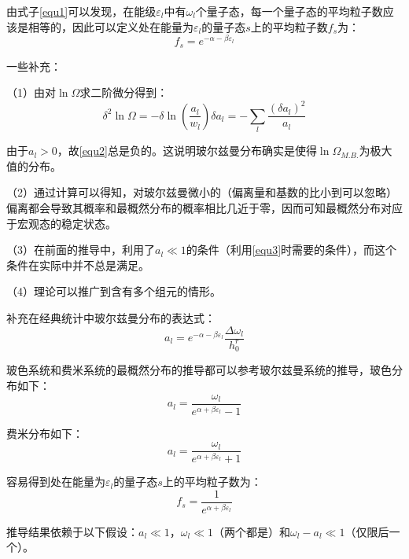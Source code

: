 \documentclass[UTF8]{ctexart}
\begin{document}
	由式子\ref{equ1}可以发现，在能级$ \varepsilon_{l} $中有$ \omega_{l} $个量子态，每一个量子态的平均粒子数应该是相等的，因此可以定义处在能量为$ \varepsilon_{l} $的量子态$ s $上的平均粒子数$ f_{s} $为：
	\begin{equation}
		f_{s}= e^{-\alpha-\beta \varepsilon_{l}}
	\end{equation}
	
	一些补充：
	
	（1）由对$ \ln \Omega $求二阶微分得到：
	\begin{equation}
		\delta^2 \ln \Omega=-\delta \ln \left( \frac{a_{l}}{w_{l}}\right) \delta a_{l}=- \sum_{l} \frac{(\delta a_{l})^2}{a_{l}}\label{equ2}
	\end{equation}
	
\noindent 由于$ a_{l}>0 $，故\ref{equ2}总是负的。这说明玻尔兹曼分布确实是使得$ \ln \Omega_{M.B.} $为极大值的分布。

	（2）通过计算可以得知，对玻尔兹曼微小的（偏离量和基数的比小到可以忽略）偏离都会导致其概率和最概然分布的概率相比几近于零，因而可知最概然分布对应于宏观态的稳定状态。
	
	（3）在前面的推导中，利用了$ a_{l}\ll 1 $的条件（利用\ref{equ3}时需要的条件），而这个条件在实际中并不总是满足。
	
	（4）理论可以推广到含有多个组元的情形。
	
	补充在经典统计中玻尔兹曼分布的表达式：
	\begin{equation}
		a_{l}=e^{-\alpha-\beta\varepsilon_{l}} \frac{\Delta \omega_{l}}{h_{0}^r}
	\end{equation}
	
	玻色系统和费米系统的最概然分布的推导都可以参考玻尔兹曼系统的推导，玻色分布如下：
	\begin{equation}
		a_{l}=\frac{\omega_{l}}{e^{\alpha+\beta \varepsilon_{l}}-1}
	\end{equation}
	
	费米分布如下：
	\begin{equation}
		a_{l}=\frac{\omega_{l}}{e^{\alpha+\beta \varepsilon_{l}}+1}
	\end{equation}
	
	容易得到处在能量为$ \varepsilon_{l} $的量子态$ s $上的平均粒子数为：
	\begin{equation}
		f_{s}=\frac{1}{e^{\alpha+\beta \varepsilon_{l}}}
	\end{equation}
	
	推导结果依赖于以下假设：$ a_{l} \ll 1 $，$ \omega_{l} \ll 1 $（两个都是）和$ \omega_{l}-a_{l} \ll 1 $（仅限后一个）。
	
\end{document}
